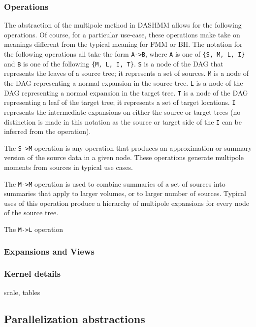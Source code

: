 \subsubsection{Operations}

The abstraction of the multipole method in DASHMM allows for the following
operations. Of course, for a particular use-case, these operations make take
on meanings different from the typical meaning for FMM or BH. The notation for
the following operations all take the form \texttt{A->B}, where \texttt{A} is
one of \texttt{\{S, M, L, I\}} and \texttt{B} is one of the
following \texttt{\{M, L, I, T\}}. \texttt{S} is a node of the DAG that
represents the leaves of a source tree; it represents a set of sources.
\texttt{M} is a node of the DAG representing a normal expansion in the source
tree. \texttt{L} is a node of the DAG representing a normal expansion in the
target tree. \texttt{T} is a node of the DAG representing a leaf of the
target tree; it represents a set of target locations. \texttt{I} represents
the intermediate expansions on either the source or target trees (no
distinction is made in this notation as the source or target side of the
\texttt{I} can be inferred from the operation).

The \texttt{S->M} operation is any operation that produces an approximation
or summary version of the source data in a given node. These operations
generate multipole moments from sources in typical use cases.

The \texttt{M->M} operation is used to combine summaries of a set of sources
into summaries that apply to larger volumes, or to larger number of sources.
Typical uses of this operation produce a hierarchy of multipole expansions
for every node of the source tree.

The \texttt{M->L} operation

\subsubsection{Expansions and Views}

\subsubsection{Kernel details}

scale, tables

\subsection{Parallelization abstractions}

